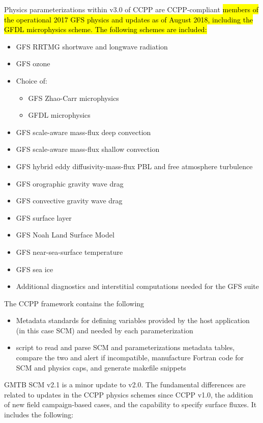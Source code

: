 Physics parameterizations within v3.0 of CCPP are CCPP-compliant \hl{members of the operational 2017 GFS physics and updates as of August 2018, including the GFDL microphysics scheme. The following schemes are included:}
\begin{itemize}
	\item GFS RRTMG shortwave and longwave radiation
	\item GFS ozone
	\item Choice of:
	\begin{itemize}
	\item GFS Zhao-Carr microphysics
	\item GFDL microphysics
	\end{itemize}
	\item GFS scale-aware mass-flux deep convection
	\item GFS scale-aware mass-flux shallow convection
	\item GFS hybrid eddy diffusivity-mass-flux PBL and free atmosphere turbulence
	\item GFS orographic gravity wave drag
	\item GFS convective gravity wave drag
	\item GFS surface layer
	\item GFS Noah Land Surface Model
	\item GFS near-sea-surface temperature
	\item GFS sea ice
	\item Additional diagnostics and interstitial computations needed for the GFS suite
\end{itemize}

The CCPP framework contains the following
\begin{itemize}
\item Metadata standards for defining variables provided by the host application (in this case SCM) and needed by each parameterization
\item {} script to read and parse SCM and parameterizations metadata tables, compare the two and alert if incompatible, manufacture Fortran code for SCM and physics caps, and generate makefile snippets
\end{itemize}

GMTB SCM v2.1 is a minor update to v2.0. The fundamental differences are related to updates in the CCPP physics schemes since CCPP v1.0, the addition of new field campaign-based cases, and the capability to specify surface fluxes. It includes the following:

